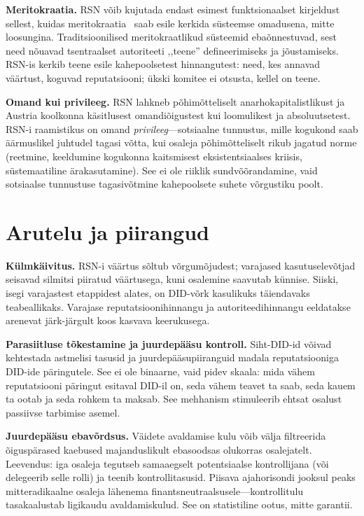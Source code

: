 \documentclass[11pt,a4paper,twocolumn]{article}
\begin{document}
\textbf{Meritokraatia.} RSN võib kujutada endast esimest funktsionaalset kirjeldust sellest, kuidas meritokraatia~\cite{young1958} saab esile kerkida süsteemse omadusena, mitte loosungina. Traditsioonilised meritokraatlikud süsteemid ebaõnnestuvad, sest need nõuavad tsentraalset autoriteeti ,,teene'' defineerimiseks ja jõustamiseks. RSN-is kerkib teene esile kahepoolsetest hinnangutest: need, kes annavad väärtust, koguvad reputatsiooni; ükski komitee ei otsusta, kellel on teene.

\textbf{Omand kui privileeg.} RSN lahkneb põhimõtteliselt anarhokapitalistlikust ja Austria koolkonna käsitlusest omandiõigustest kui loomulikest ja absoluutsetest. RSN-i raamistikus on omand \emph{privileeg}---sotsiaalne tunnustus, mille kogukond saab äärmuslikel juhtudel tagasi võtta, kui osaleja põhimõtteliselt rikub jagatud norme (reetmine, keeldumine kogukonna kaitsmisest eksistentsiaalses kriisis, süstemaatiline ärakasutamine). See ei ole riiklik sundvõõrandamine, vaid sotsiaalse tunnustuse tagasivõtmine kahepoolsete suhete võrgustiku poolt.

\section{Arutelu ja piirangud}

\textbf{Külmkäivitus.} RSN-i väärtus sõltub võrgumõjudest; varajased kasutuselevõtjad seisavad silmitsi piiratud väärtusega, kuni osalemine saavutab künnise. Siiski, isegi varajastest etappidest alates, on DID-võrk kasulikuks täiendavaks teabeallikaks. Varajase reputatsioonihinnangu ja autoriteedihinnangu eeldatakse arenevat järk-järgult koos kasvava keerukusega.

\textbf{Parasiitluse tõkestamine ja juurdepääsu kontroll.} Siht-DID-id võivad kehtestada astmelisi tasusid ja juurdepääsupiiranguid madala reputatsiooniga DID-ide päringutele. See ei ole binaarne, vaid pidev skaala: mida vähem reputatsiooni päringut esitaval DID-il on, seda vähem teavet ta saab, seda kauem ta ootab ja seda rohkem ta maksab. See mehhanism stimuleerib ehtsat osalust passiivse tarbimise asemel.

\textbf{Juurdepääsu ebavõrdsus.} Väidete avaldamise kulu võib välja filtreerida õiguspärased kaebused majanduslikult ebasoodsas olukorras osalejatelt. Leevendus: iga osaleja tegutseb samaaegselt potentsiaalse kontrollijana (või delegeerib selle rolli) ja teenib kontrollitasusid. Piisava ajahorisondi jooksul peaks mitteradikaalne osaleja lähenema finantsneutraalsusele---kontrollitulu tasakaalustab ligikaudu avaldamiskulud. See on statistiline ootus, mitte garantii.
\end{document}

